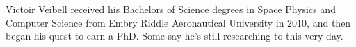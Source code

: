 \documentclass[11 pt]{GMUDissertation}
\begin{document}
%
\startofchapters








%




%
%



\cvpage

\noindent Victoir Veibell received his Bachelors of Science degrees in Space Physics and Computer Science from Embry Riddle Aeronautical University in 2010, and then began his quest to earn a PhD. Some say he's still researching to this very day.
\end{document}

